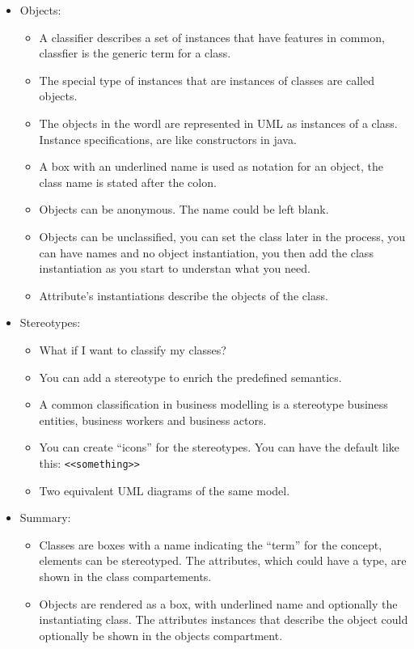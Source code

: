 \begin{itemize}
    \item Objects:
        \begin{itemize}
            \item A classifier describes a set of instances that have features in common, classfier is the generic term for a class.
            \item The special type of instances that are instances of classes are called objects. 
            \item The objects in the wordl are represented in UML as instances of a class. Instance specifications, are like constructors in java.
            \item A box with an underlined name is used as notation for an object, the class name is stated after the colon. 
            \item Objects can be anonymous. The name could be left blank. 
            \item Objects can be unclassified, you can set the class later in the process, you can have names and no object instantiation, you then add the class instantiation as you start to understan what you need. 
            \item Attribute's instantiations describe the objects of the class. 
        \end{itemize}
    
    \item Stereotypes:
        \begin{itemize}
            \item What if I want to classify my classes? 
            \item You can add a stereotype to enrich the predefined semantics. 
            \item A common classification in business modelling is a stereotype business entities, business workers and business actors. 
            \item You can create ``icons'' for the stereotypes. You can have the default like this: \verb|<<something>>|
            \item Two equivalent UML diagrams of the same model.
        \end{itemize}
    
    \item Summary:
        \begin{itemize}
            \item Classes are boxes with a name indicating the ``term'' for the concept, elements can be stereotyped. The attributes, which could have a type, are shown in the class compartements.
            \item Objects are rendered as a box, with underlined name and optionally the instantiating class. The attributes instances that describe the object could optionally be shown in the objects compartment.
        \end{itemize}
\end{itemize}


